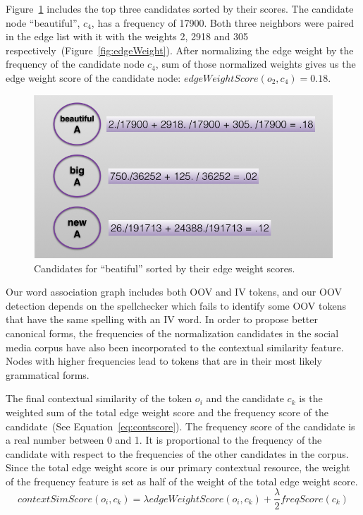 \documentclass[a4paper,onesided,12pt]{report}
\begin{document}
Figure~\ref{fig:contextscores} includes the top three candidates sorted by their scores. The candidate node ``beautiful'', $c_4$, has a frequency of 17900. Both three neighbors were paired in the edge list with it with the weights 2, 2918 and 305 respectively~(Figure~\ref{fig:edgeWeight}). After normalizing the edge weight by the frequency of the candidate node  $c_4$, sum of those normalized weights gives us the edge weight score of the candidate node: $edgeWeightScore(o_2,c_4) = 0.18$.

\begin{figure}[htb]
\begin{center}
\includegraphics[scale=0.5]{fig/contextScores}
\caption{Candidates for ``beatiful'' sorted by their edge weight scores.}
\label{fig:contextscores}
\end{center}
\end{figure}

Our word association graph includes both OOV and IV tokens, and our OOV detection depends on the spellchecker which fails to identify some OOV tokens that have the same spelling with an IV word. In order to propose better canonical forms, the frequencies of the normalization candidates in the social media corpus have also been incorporated to the contextual similarity feature. Nodes with higher frequencies lead to tokens that are in their most likely grammatical forms.

The final contextual similarity of the token $o_i$ and the candidate $c_k$ is the weighted sum of the total edge weight score and the frequency score of the candidate~(See Equation~\ref{eq:contscore}). The frequency score of the candidate is a real number between 0 and 1. It is proportional to the frequency of the candidate with respect to the frequencies of the other candidates in the corpus. Since the total edge weight score is our primary contextual resource, the weight of the frequency feature is set as half of the weight of the total edge weight score.
\begin{equation}
contextSimScore(o_i,c_k) = \lambda edgeWeightScore(o_i,c_k) + \frac{\lambda} 2 freqScore(c_k)
\label{eq:contscore}
\end{equation}
\end{document}
